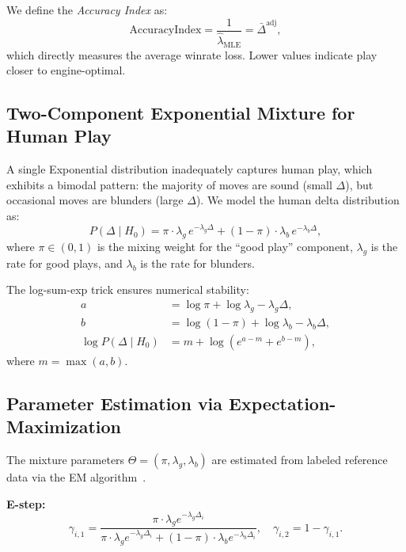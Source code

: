 \documentclass[11pt,a4paper]{article}
\begin{document}
We define the \emph{Accuracy Index} as:
\begin{equation}
    \text{AccuracyIndex} = \frac{1}{\hat{\lambda}_{\text{MLE}}}
    = \bar{\Delta}^{\text{adj}},
    \label{eq:accuracy_index}
\end{equation}
which directly measures the average winrate loss. Lower values indicate play
closer to engine-optimal.

\subsection{Two-Component Exponential Mixture for Human Play}
\label{sec:mixture}

A single Exponential distribution inadequately captures human play, which
exhibits a bimodal pattern: the majority of moves are sound (small $\Delta$),
but occasional moves are blunders (large $\Delta$). We model the human
delta distribution as:
\begin{equation}
    P(\Delta \mid H_0) = \pi \cdot \lambda_g \, e^{-\lambda_g \Delta}
    + (1 - \pi) \cdot \lambda_b \, e^{-\lambda_b \Delta},
    \label{eq:mixture_pdf}
\end{equation}
where $\pi \in (0, 1)$ is the mixing weight for the ``good play'' component,
$\lambda_g$ is the rate for good plays, and $\lambda_b$ is the rate for
blunders.

The log-sum-exp trick ensures numerical stability:
\begin{align}
    a &= \log \pi + \log \lambda_g - \lambda_g \Delta, \\
    b &= \log(1 - \pi) + \log \lambda_b - \lambda_b \Delta, \\
    \log P(\Delta \mid H_0) &= m + \log\!\left(e^{a-m} + e^{b-m}\right),
\end{align}
where $m = \max(a, b)$.

\subsection{Parameter Estimation via Expectation-Maximization}
\label{sec:em}

The mixture parameters $\Theta = (\pi, \lambda_g, \lambda_b)$ are estimated
from labeled reference data via the EM algorithm~\citep{dempster1977maximum}.

\textbf{E-step:}
\begin{equation}
    \gamma_{i,1} = \frac{\pi \cdot \lambda_g e^{-\lambda_g \Delta_i}}
    {\pi \cdot \lambda_g e^{-\lambda_g \Delta_i}
    + (1-\pi) \cdot \lambda_b e^{-\lambda_b \Delta_i}}, \quad
    \gamma_{i,2} = 1 - \gamma_{i,1}.
    \label{eq:e_step}
\end{equation}
\end{document}
